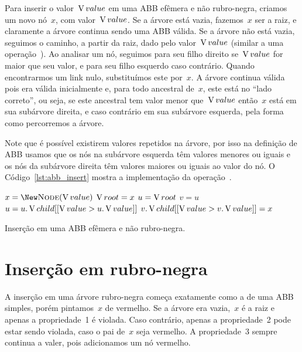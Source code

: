 \documentclass[main.tex]{subfiles}
\begin{document}
Para inserir o valor~$\operatorname{V}{value}$ em uma ABB efêmera e não rubro-negra, criamos um novo nó~$x$, com valor~$\operatorname{V}{value}$. Se a árvore está vazia, fazemos~$x$ ser a raiz, e claramente a árvore continua sendo uma ABB válida.
Se a árvore não está vazia, seguimos o caminho, a partir da raiz, dado pelo valor~$\operatorname{V}{value}$ (similar a uma operação~). Ao analisar um nó, seguimos para seu filho direito se~$\operatorname{V}{value}$ for maior que seu valor, e para seu filho esquerdo caso contrário. Quando encontrarmos um link nulo, substituímos este por~$x$. A árvore continua válida pois era válida inicialmente e, para todo ancestral de~$x$, este está no ``lado correto'', ou seja, se este ancestral tem valor menor que~$\operatorname{V}{value}$ então~$x$ está em sua subárvore direita, e caso contrário em sua subárvore esquerda, pela forma como percorremos a árvore.

Note que é possível existirem valores repetidos na árvore, por isso na definição de ABB usamos que os nós na subárvore esquerda têm valores menores ou iguais e os nós da subárvore direita têm valores maiores ou iguais ao valor do nó. O Código~\ref{lst:abb_insert} mostra a implementação da operação~.

\begin{algorithm}
\begin{algorithmic}[1]

	\State $x = \New \Call{Node}{\val}$ 
		\State $\operatorname{V}{root} = x$
	\Else
		\State $u = \operatorname{V}{root}$
		 
			\State $v = u$
			\State $u = u.\operatorname{V}{child}[[\operatorname{V}{value} > u.\operatorname{V}{value}]]$
		\EndWhile
		\State $v.\operatorname{V}{child}[[\operatorname{V}{value} > v.\operatorname{V}{value}]] = x$
	\EndIf
\EndFunction

\end{algorithmic}
\caption{Inserção em uma ABB efêmera e não rubro-negra.} \label{lst:abb_insert}
\end{algorithm}

\section{Inserção em rubro-negra}

A inserção em uma árvore rubro-negra começa exatamente como a de uma ABB simples, porém pintamos~$x$ de vermelho.
Se a árvore era vazia,~$x$ é a raiz e apenas a propriedade~1 é violada. Caso contrário, apenas a propriedade~2 pode estar sendo violada, caso o pai de~$x$ seja vermelho. A propriedade~3 sempre continua a valer, pois adicionamos um nó vermelho.
\end{document}
